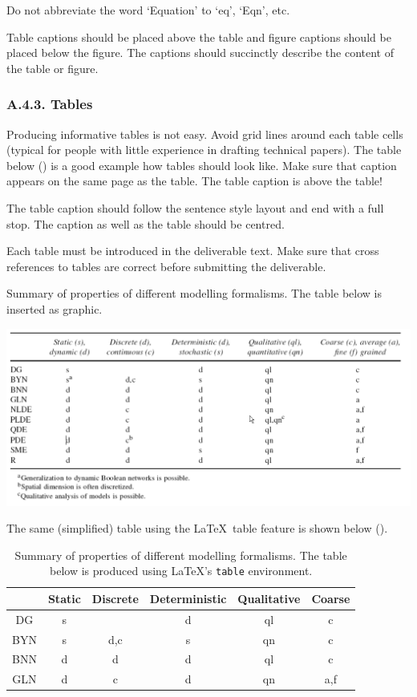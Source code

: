 Do not abbreviate the word ‘Equation’ to ‘eq’, ‘Eqn’, etc.

Table captions should be placed above the table and figure captions should be placed below the figure. The captions should succinctly describe the content of the table or figure.

\subsubsection*{A.4.3. Tables}
\label{sec:appendix-a43-tables}

Producing informative tables is not easy. Avoid grid lines around each table cells (typical for people with little experience in drafting technical papers). The table below () is a good example how tables should look like. Make sure that caption appears on the same page as the table. The table caption is above the table!

The table caption should follow the sentence style layout and end with a full stop. The caption as well as the table should be centred.

Each table must be introduced in the deliverable text. Make sure that cross references to tables are correct before submitting the deliverable.

\begin{table}[htb]
	\centering
	\caption{Summary of properties of different modelling formalisms. The table below is inserted as graphic.}
	\label{tab:graphicastable}
	\includegraphics[width=1.00\linewidth]{graphics/graphicastable}  
\end{table}

The same (simplified) table using the \LaTeX\ table feature is shown below ().

\begin{table}[htb]
	\centering
	\caption{Summary of properties of different modelling formalisms. The table below is produced using \LaTeX's {\tt table} environment.}
	\label{tab:latextable}
	\begin{tabular}{cccccc}
		\hline
		& Static & Discrete & Deterministic & Qualitative & Coarse \\
	    \hline
	    DG & s &  & d & ql & c \\
	    BYN & s & d,c & s & qn & c\\
	    BNN & d & d & d & ql & c\\
	    GLN & d & c & d & qn & a,f\\
		\hline
	\end{tabular}
\end{table}

